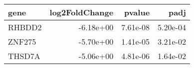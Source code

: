 \begin{tabular}{lrrr}
\toprule
  gene &  log2FoldChange &   pvalue &     padj \\
\midrule
RHBDD2 &       -6.18e+00 & 7.61e-08 & 5.20e-04 \\
ZNF275 &       -5.70e+00 & 1.41e-05 & 3.21e-02 \\
THSD7A &       -5.06e+00 & 4.81e-06 & 1.64e-02 \\
\bottomrule
\end{tabular}

